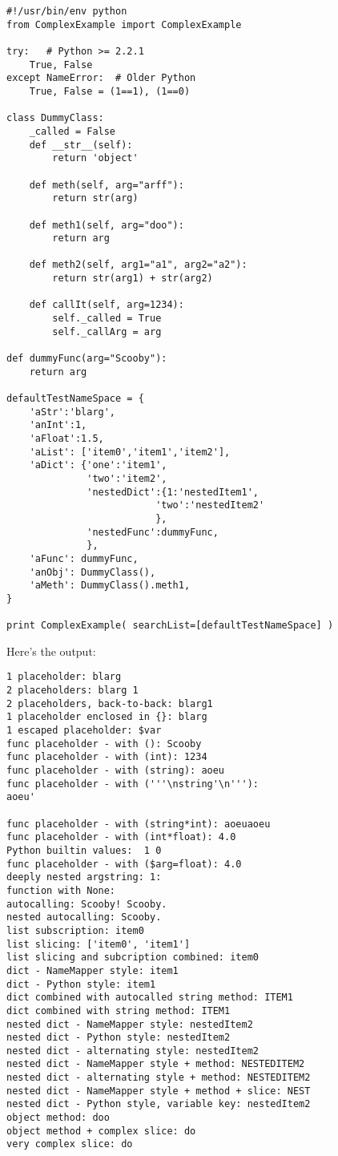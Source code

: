 \begin{verbatim}
#!/usr/bin/env python
from ComplexExample import ComplexExample

try:   # Python >= 2.2.1
    True, False
except NameError:  # Older Python
    True, False = (1==1), (1==0)

class DummyClass:
    _called = False
    def __str__(self):
        return 'object'

    def meth(self, arg="arff"):
        return str(arg)

    def meth1(self, arg="doo"):
        return arg

    def meth2(self, arg1="a1", arg2="a2"):
        return str(arg1) + str(arg2)

    def callIt(self, arg=1234):
        self._called = True
        self._callArg = arg

def dummyFunc(arg="Scooby"):
    return arg

defaultTestNameSpace = {
    'aStr':'blarg',
    'anInt':1,
    'aFloat':1.5,
    'aList': ['item0','item1','item2'],
    'aDict': {'one':'item1',
              'two':'item2',
              'nestedDict':{1:'nestedItem1',
                          'two':'nestedItem2'
                          },
              'nestedFunc':dummyFunc,
              },
    'aFunc': dummyFunc,
    'anObj': DummyClass(),
    'aMeth': DummyClass().meth1,
}

print ComplexExample( searchList=[defaultTestNameSpace] )
\end{verbatim}

Here's the output:

\begin{verbatim}
1 placeholder: blarg
2 placeholders: blarg 1
2 placeholders, back-to-back: blarg1
1 placeholder enclosed in {}: blarg
1 escaped placeholder: $var
func placeholder - with (): Scooby
func placeholder - with (int): 1234
func placeholder - with (string): aoeu
func placeholder - with ('''\nstring'\n'''): 
aoeu'

func placeholder - with (string*int): aoeuaoeu
func placeholder - with (int*float): 4.0
Python builtin values:  1 0
func placeholder - with ($arg=float): 4.0
deeply nested argstring: 1:
function with None: 
autocalling: Scooby! Scooby.
nested autocalling: Scooby.
list subscription: item0
list slicing: ['item0', 'item1']
list slicing and subcription combined: item0
dict - NameMapper style: item1
dict - Python style: item1
dict combined with autocalled string method: ITEM1
dict combined with string method: ITEM1
nested dict - NameMapper style: nestedItem2
nested dict - Python style: nestedItem2
nested dict - alternating style: nestedItem2
nested dict - NameMapper style + method: NESTEDITEM2
nested dict - alternating style + method: NESTEDITEM2
nested dict - NameMapper style + method + slice: NEST
nested dict - Python style, variable key: nestedItem2
object method: doo
object method + complex slice: do
very complex slice: do

\end{verbatim}

